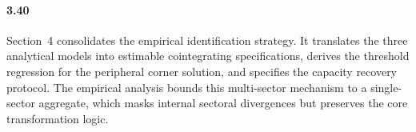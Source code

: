 \paragraph{3.40}
Section~4 consolidates the empirical identification
strategy. It translates the three analytical models into
estimable cointegrating specifications, derives the
threshold regression for the peripheral corner solution,
and specifies the capacity recovery protocol. The
empirical analysis bounds this multi-sector mechanism to
a single-sector aggregate, which masks internal sectoral
divergences but preserves the core transformation logic.